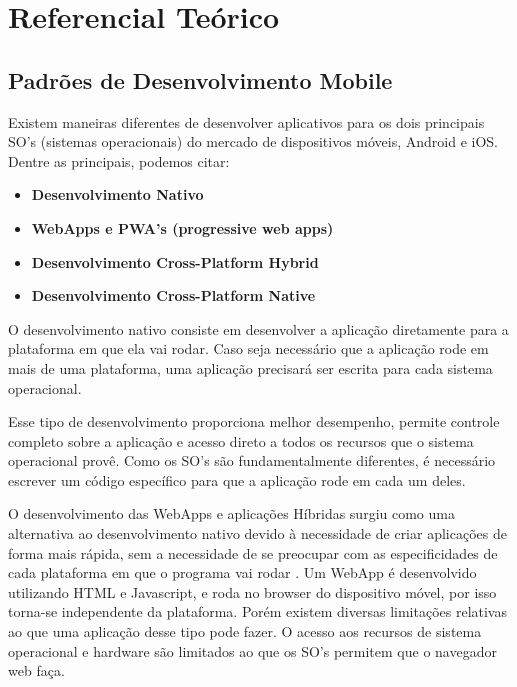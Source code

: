 \chapter{Referencial Teórico}

\section{Padrões de Desenvolvimento Mobile}
\label{sec:whatisflutter}
Existem maneiras diferentes de desenvolver aplicativos para os dois principais SO’s (sistemas operacionais) do mercado de dispositivos móveis, Android e iOS. Dentre as principais, podemos citar:


\begin{itemize}
    \item \textbf{Desenvolvimento Nativo} 
    \item \textbf{WebApps e PWA’s (progressive web apps)} 
    \item \textbf{Desenvolvimento Cross-Platform Hybrid} 
    \item \textbf{Desenvolvimento Cross-Platform Native} 
\end{itemize}

O desenvolvimento nativo consiste em desenvolver a aplicação diretamente para a plataforma em que ela vai rodar.
Caso seja necessário que a aplicação rode em mais de uma plataforma, uma aplicação precisará ser escrita para cada 
sistema operacional.

Esse tipo de desenvolvimento proporciona melhor desempenho, permite controle completo sobre a 
aplicação e acesso direto a todos os recursos que o sistema operacional provê. 
Como os SO’s são fundamentalmente diferentes, é necessário escrever um código 
específico para que a aplicação rode em cada um deles.   

O desenvolvimento das WebApps e aplicações Híbridas surgiu como uma 
alternativa ao desenvolvimento nativo devido à necessidade de criar 
aplicações de forma mais rápida, sem a necessidade de se preocupar 
com as especificidades de cada plataforma em que o programa vai rodar
. 
Um WebApp é desenvolvido utilizando HTML e Javascript, e roda no browser do dispositivo móvel, 
por isso torna-se independente da plataforma. Porém existem diversas limitações relativas 
ao que uma aplicação desse tipo pode fazer. O acesso aos recursos de sistema operacional 
e hardware são limitados ao que os SO’s permitem que o navegador web faça. 
 


